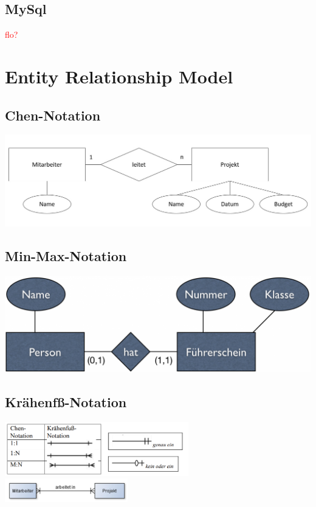 \documentclass[12pt,a4paper]{article}
\begin{document}
	\subsection{MySql}
		\textcolor{red}{flo?}

\section{Entity Relationship Model}
	\subsection{Chen-Notation}
	\includegraphics[width=\textwidth]{Bilder/chen.jpg}

	\subsection{Min-Max-Notation}
	\includegraphics[width=\textwidth]{Bilder/min_max.png}

	\subsection{Krähenfß-Notation}
	\includegraphics[width=0.6\textwidth]{Bilder/kraehenfuss1.PNG}
	\includegraphics[width=0.4\textwidth]{Bilder/kraehenfuss2.PNG}
\end{document}

